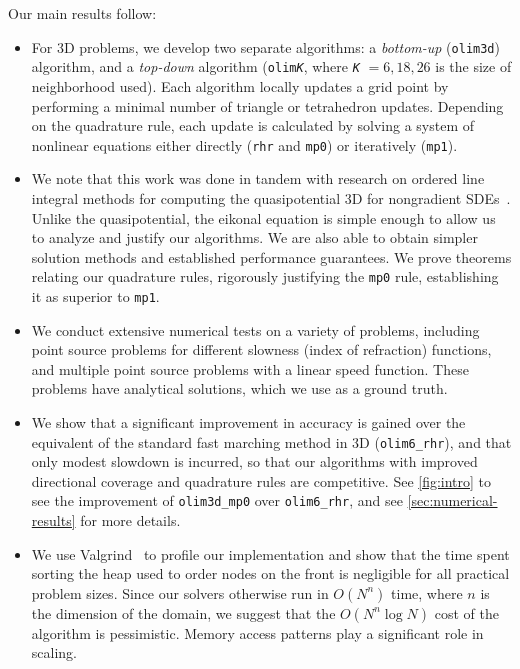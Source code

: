 \documentclass{article}
\begin{document}
Our main results follow:
\begin{itemize}
\item For 3D problems, we develop two separate algorithms: a
  \emph{bottom-up} (\texttt{olim3d}) algorithm, and a \emph{top-down}
  algorithm (\texttt{olim\emph{K}}, where \texttt{\emph{K}}
  \hspace{-0.1em}$=6,18,26$ is the size of neighborhood used). Each
  algorithm locally updates a grid point by performing a minimal
  number of triangle or tetrahedron updates. Depending on the
  quadrature rule, each update is calculated by solving a system of
  nonlinear equations either directly (\texttt{rhr} and \texttt{mp0})
  or iteratively (\texttt{mp1}).
\item We note that this work was done in tandem with research on
  ordered line integral methods for computing the quasipotential 3D
  for nongradient
  SDEs~\cite{dahiya2017ordered,yang2019computing,dahiya2018ordered}. Unlike
  the quasipotential, the eikonal equation is simple enough to allow
  us to analyze and justify our algorithms. We are also able to obtain
  simpler solution methods and established performance guarantees. We
  prove theorems relating our quadrature rules, rigorously justifying
  the \texttt{mp0} rule, establishing it as superior to \texttt{mp1}.
\item We conduct extensive numerical tests on a variety of problems,
  including point source problems for different slowness (index of
  refraction) functions, and multiple point source problems with a
  linear speed function. These problems have analytical solutions,
  which we use as a ground truth.
\item We show that a significant improvement in accuracy is gained
  over the equivalent of the standard fast marching method in 3D
  (\texttt{olim6\_rhr}), and that only modest slowdown is incurred, so
  that our algorithms with improved directional coverage and
  quadrature rules are competitive. See \cref{fig:intro} to see the
  improvement of \texttt{olim3d\_mp0} over \texttt{olim6\_rhr}, and
  see \cref{sec:numerical-results} for more details.
\item We use Valgrind~\cite{nethercote2007valgrind} to profile our
  implementation and show that the time spent sorting the heap used to
  order nodes on the front is negligible for all practical problem
  sizes. Since our solvers otherwise run in $O(N^n)$ time, where $n$
  is the dimension of the domain, we suggest that the $O(N^n \log N)$
  cost of the algorithm is pessimistic. Memory access patterns play a
  significant role in scaling.
\end{itemize}
\end{document}

